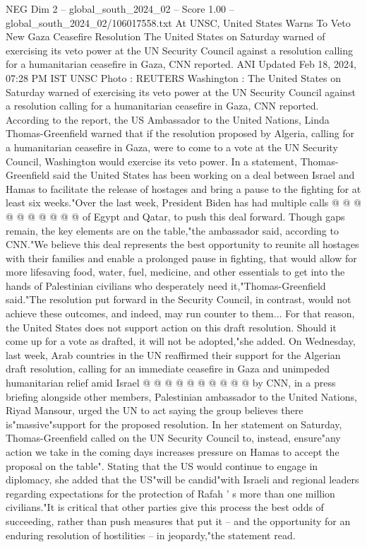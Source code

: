 \begin{textsample}{NEG Dim 2 – global\_south\_2024\_02 – Score 1.00 – global\_south\_2024\_02/106017558.txt}  \label{ex:f2_neg_248}
At UNSC, United States Warns To Veto New Gaza Ceasefire Resolution The United States on Saturday warned of exercising its veto power at the UN Security Council against a resolution calling for a humanitarian ceasefire in Gaza, CNN reported.
ANI Updated Feb 18, 2024, 07:28 PM IST UNSC Photo : REUTERS Washington : The United States on Saturday warned of exercising its veto power at the UN Security Council against a resolution calling for a humanitarian ceasefire in Gaza, CNN reported.
According to the report, the US Ambassador to the United Nations, Linda Thomas-Greenfield warned that if the resolution proposed by Algeria, calling for a humanitarian ceasefire in Gaza, were to come to a vote at the UN Security Council, Washington would exercise its veto power.
In a statement, Thomas-Greenfield said the United States has been working on a deal between Israel and Hamas to facilitate the release of hostages and bring a pause to the fighting for at least six weeks."Over the last week, President Biden has had multiple calls @ @ @ @ @ @ @ @ @ @ of Egypt and Qatar, to push this deal forward.
Though gaps remain, the key elements are on the table,"the ambassador said, according to CNN."We believe this deal represents the best opportunity to reunite all hostages with their families and enable a prolonged pause in fighting, that would allow for more lifesaving food, water, fuel, medicine, and other essentials to get into the hands of Palestinian civilians who desperately need it,"Thomas-Greenfield said."The resolution put forward in the Security Council, in contrast, would not achieve these outcomes, and indeed, may run counter to them...
For that reason, the United States does not support action on this draft resolution.
Should it come up for a vote as drafted, it will not be adopted,"she added.
On Wednesday, last week, Arab countries in the UN reaffirmed their support for the Algerian draft resolution, calling for an immediate ceasefire in Gaza and unimpeded humanitarian relief amid Israel @ @ @ @ @ @ @ @ @ @ by CNN, in a press briefing alongside other members, Palestinian ambassador to the United Nations, Riyad Mansour, urged the UN to act saying the group believes there is"massive"support for the proposed resolution.
In her statement on Saturday, Thomas-Greenfield called on the UN Security Council to, instead, ensure"any action we take in the coming days increases pressure on Hamas to accept the proposal on the table".
Stating that the US would continue to engage in diplomacy, she added that the US"will be candid"with Israeli and regional leaders regarding expectations for the protection of Rafah ' s more than one million civilians."It is critical that other parties give this process the best odds of succeeding, rather than push measures that put it -- and the opportunity for an enduring resolution of hostilities -- in jeopardy,"the statement read.

\end{textsample}
